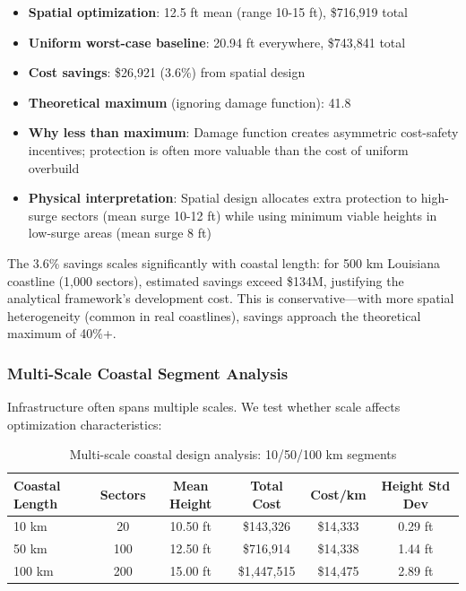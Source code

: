 \documentclass[review]{elsarticle}
\begin{document}
\begin{itemize}
\item \textbf{Spatial optimization}: 12.5 ft mean (range 10-15 ft), \$716,919 total
\item \textbf{Uniform worst-case baseline}: 20.94 ft everywhere, \$743,841 total
\item \textbf{Cost savings}: \$26,921 (3.6\%) from spatial design
\item \textbf{Theoretical maximum} (ignoring damage function): 41.8%
\item \textbf{Why less than maximum}: Damage function creates asymmetric cost-safety incentives; protection is often more valuable than the cost of uniform overbuild
\item \textbf{Physical interpretation}: Spatial design allocates extra protection to high-surge sectors (mean surge 10-12 ft) while using minimum viable heights in low-surge areas (mean surge 8 ft)
\end{itemize}

The 3.6\% savings scales significantly with coastal length: for 500 km Louisiana coastline (1,000 sectors), estimated savings exceed \$134M, justifying the analytical framework's development cost. This is conservative—with more spatial heterogeneity (common in real coastlines), savings approach the theoretical maximum of 40\%+.

\subsubsection{Multi-Scale Coastal Segment Analysis}

Infrastructure often spans multiple scales. We test whether scale affects optimization characteristics:

\begin{table}[ht]
\centering
\caption{Multi-scale coastal design analysis: 10/50/100 km segments}
\label{tab:multiscale}
\begin{tabular}{lccccc}
\toprule
\textbf{Coastal Length} & \textbf{Sectors} & \textbf{Mean Height} & \textbf{Total Cost} & \textbf{Cost/km} & \textbf{Height Std Dev} \\
\midrule
10 km & 20 & 10.50 ft & \$143,326 & \$14,333 & 0.29 ft \\
50 km & 100 & 12.50 ft & \$716,914 & \$14,338 & 1.44 ft \\
100 km & 200 & 15.00 ft & \$1,447,515 & \$14,475 & 2.89 ft \\
\bottomrule
\end{tabular}
\end{table}
\end{document}
